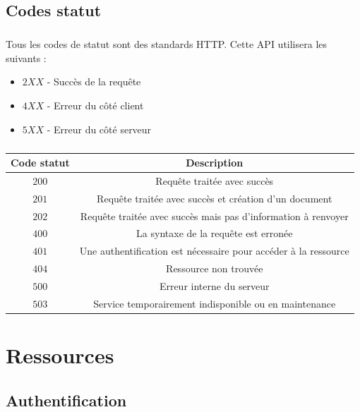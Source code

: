 \documentclass[titlepage, 12pt]{report}
\begin{document}
\section{Codes statut}

\paragraph{} Tous les codes de statut sont des standards HTTP. Cette API utilisera les suivants : 
\begin{itemize}
	\item $ 2XX $ - Succès de la requête
	\item $ 4XX $ - Erreur du côté client
	\item $ 5XX $ - Erreur du côté serveur		
\end{itemize}

\paragraph{}

\begin{center}
	\begin{tabular}{|c|c|}
		\hline
		Code statut & Description \\
		\hline \hline
		$ 200 $ & Requête traitée avec succès \\
		\hline 
		$ 201 $ & Requête traitée avec succès et création d'un document \\	
		\hline 
		$ 202 $ & Requête traitée avec succès mais pas d'information à renvoyer \\
		\hline \hline 
		$ 400 $ & La syntaxe de la requête est erronée \\	
		\hline 
		$ 401 $ & Une authentification est nécessaire pour accéder à la ressource \\	
		\hline
		$ 404 $ & Ressource non trouvée \\
		\hline \hline
		$ 500 $ & Erreur interne du serveur \\
		\hline
		$ 503 $ & Service temporairement indisponible ou en maintenance \\ 	
		\hline
	\end{tabular}
\end{center}

\chapter{Ressources}

%
%
\section{Authentification}
\end{document}
